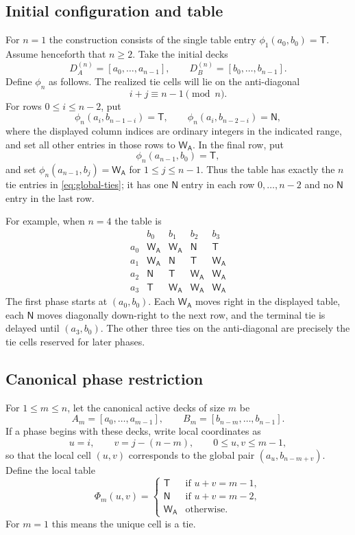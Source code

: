 \documentclass[12pt]{article}
\newcommand{\WA}{\mathsf{W_A}}
\newcommand{\TT}{\mathsf{T}}
\newcommand{\NN}{\mathsf{N}}
\begin{document}
\subsection{Initial configuration and table}
For $n=1$ the construction consists of the single table entry $\phi_1(a_0,b_0)=\TT$. Assume henceforth that $n\ge 2$. Take the initial decks
\[
D_A^{(n)}=[a_0,\dots,a_{n-1}],\qquad D_B^{(n)}=[b_0,\dots,b_{n-1}].
\]
Define $\phi_n$ as follows. The realized tie cells will lie on the anti-diagonal
\begin{equation}\label{eq:global-ties}
 i+j\equiv n-1 \pmod n.
\end{equation}
For rows $0\le i\le n-2$, put
\[
\phi_n(a_i,b_{n-1-i})=\TT,\qquad \phi_n(a_i,b_{n-2-i})=\NN,
\]
where the displayed column indices are ordinary integers in the indicated range, and set all other entries in those rows to $\WA$. In the final row, put
\[
\phi_n(a_{n-1},b_0)=\TT,
\]
and set $\phi_n(a_{n-1},b_j)=\WA$ for $1\le j\le n-1$. Thus the table has exactly the $n$ tie entries in \eqref{eq:global-ties}; it has one $\NN$ entry in each row $0,\dots,n-2$ and no $\NN$ entry in the last row.

For example, when $n=4$ the table is
\[
\begin{array}{c|cccc}
 & b_0 & b_1 & b_2 & b_3\\
\hline
 a_0 & \WA & \WA & \NN & \TT\\
 a_1 & \WA & \NN & \TT & \WA\\
 a_2 & \NN & \TT & \WA & \WA\\
 a_3 & \TT & \WA & \WA & \WA
\end{array}
\]
The first phase starts at $(a_0,b_0)$. Each $\WA$ moves right in the displayed table, each $\NN$ moves diagonally down-right to the next row, and the terminal tie is delayed until $(a_3,b_0)$. The other three ties on the anti-diagonal are precisely the tie cells reserved for later phases.

\subsection{Canonical phase restriction}
For $1\le m\le n$, let the canonical active decks of size $m$ be
\[
A_m=[a_0,\dots,a_{m-1}],\qquad B_m=[b_{n-m},\dots,b_{n-1}].
\]
If a phase begins with these decks, write local coordinates as
\[
u=i,
\qquad
v=j-(n-m),
\qquad 0\le u,v\le m-1,
\]
so that the local cell $(u,v)$ corresponds to the global pair $(a_u,b_{n-m+v})$. Define the local table
\[
\Phi_m(u,v)=
\begin{cases}
\TT & \text{if } u+v=m-1, \\
\NN & \text{if } u+v=m-2, \\
\WA & \text{otherwise}.
\end{cases}
\]
For $m=1$ this means the unique cell is a tie.
\end{document}
